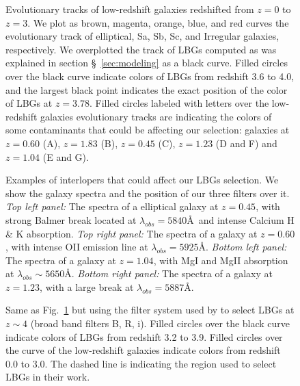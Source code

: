 \documentclass[iop, revtex4]{emulateapj}
\begin{document}
\begin{figure}
\caption{Evolutionary tracks of low-redshift galaxies redshifted from $z=0$ to $z=3$. We plot as brown, magenta, orange, blue, and red curves the evolutionary track of elliptical, Sa, Sb, Sc, and Irregular galaxies, respectively. We overplotted the track of LBGs computed as was explained in section \S~\ref{sec:modeling} as a black curve. Filled circles over the black curve indicate colors of LBGs from redshift 3.6 to 4.0, and the largest black point indicates the exact position of the color of LBGs at $z=3.78$. Filled circles labeled with letters over the low-redshift galaxies evolutionary tracks are indicating the colors of some contaminants that could be affecting our selection: galaxies at $z=0.60$ (A), $z=1.83$ (B), $z=0.45$ (C), $z=1.23$ (D and F) and $z=1.04$ (E and G).\\}
\label{fig:evoltrack_all} 
\end{figure}

\begin{figure}
\caption{Examples of interlopers that could affect our LBGs selection. We show the galaxy spectra and the position of our three filters over it. \textit{Top left panel:} The spectra of a elliptical galaxy at $z=0.45$, with strong Balmer break located at $\lambda_{obs}=5840$\AA\,  and intense Calcium H \& K absorption. \textit{Top right panel:}  The spectra of a galaxy at $z=0.60$, with intense OII emission line at $\lambda_{obs}=5925$\AA. \textit{Bottom left panel:} The spectra of a galaxy at $z=1.04$, with MgI and MgII absorption at $\lambda_{obs}\sim5650$\AA. \textit{Bottom right panel:} The spectra of a galaxy at $z=1.23$, with a large break at $\lambda_{obs}=5887$\AA. \\}
\label{fig:contaminants} 
\end{figure}

\begin{figure}
\caption{Same as Fig.~\ref{fig:evoltrack_all} but using the filter system used by \citet{Ouchi04a} to select LBGs at $z\sim4$ (broad band filters B, R, i). Filled circles over the black curve indicate colors of LBGs from redshift 3.2 to 3.9. Filled circles over the curve of the low-redshift galaxies indicate colors from redshift 0.0 to 3.0. The dashed line is indicating the region used \citet{Ouchi04a} to select LBGs in their work.\\}
\label{fig:evoltrack_all_ouchi} 
\end{figure}
\end{document}
